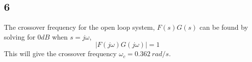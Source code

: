 \documentclass[12pt,a4paper]{article}
\begin{document}
  \subsection{6}
  The crossover frequency for the open loop system, $F(s)G(s)$ can be
  found by solving for $0dB$ when $s=j\omega$,
  \begin{equation}
    |F(j\omega)G(j\omega)|=1
  \end{equation}
  This will give the crossover frequency $\omega_c=0.362\:rad/s$.
\end{document}
